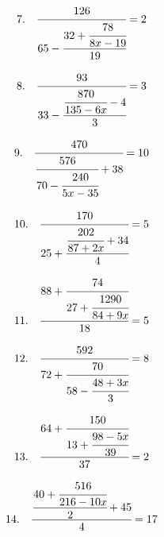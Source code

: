 \documentclass{article}
\begin{document}
\noindent
\begin{minipage}[t]{0.5000\textwidth}
\begin{align*}
7.\hspace{10pt}\cfrac{126}{65-\cfrac{32+\cfrac{78}{8x-19}}{19}}&=2
\end{align*}
\end{minipage}
\begin{minipage}[t]{0.5000\textwidth}
\begin{align*}
8.\hspace{10pt}\cfrac{93}{33-\cfrac{\cfrac{870}{135-6x}-4}{3}}&=3
\end{align*}
\end{minipage}
\vspace{10 mm}

\noindent
\begin{minipage}[t]{0.5000\textwidth}
\begin{align*}
9.\hspace{10pt}\cfrac{470}{\cfrac{576}{70-\cfrac{240}{5x-35}}+38}&=10
\end{align*}
\end{minipage}
\begin{minipage}[t]{0.5000\textwidth}
\begin{align*}
10.\hspace{10pt}\cfrac{170}{25+\cfrac{\cfrac{202}{87+2x}+34}{4}}&=5
\end{align*}
\end{minipage}
\vspace{10 mm}

\noindent
\begin{minipage}[t]{0.5000\textwidth}
\begin{align*}
11.\hspace{10pt}\cfrac{88+\cfrac{74}{27+\cfrac{1290}{84+9x}}}{18}&=5
\end{align*}
\end{minipage}
\begin{minipage}[t]{0.5000\textwidth}
\begin{align*}
12.\hspace{10pt}\cfrac{592}{72+\cfrac{70}{58-\cfrac{48+3x}{3}}}&=8
\end{align*}
\end{minipage}
\vspace{10 mm}

\noindent
\begin{minipage}[t]{0.5000\textwidth}
\begin{align*}
13.\hspace{10pt}\cfrac{64+\cfrac{150}{13+\cfrac{98-5x}{39}}}{37}&=2
\end{align*}
\end{minipage}
\begin{minipage}[t]{0.5000\textwidth}
\begin{align*}
14.\hspace{10pt}\cfrac{\cfrac{40+\cfrac{516}{216-10x}}{2}+45}{4}&=17
\end{align*}
\end{minipage}
\vspace{10 mm}
\end{document}
